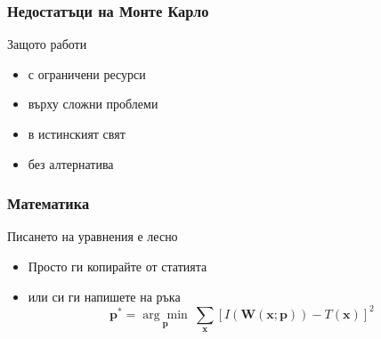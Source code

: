 \documentclass[serif,mathserif,14pt]{beamer}
\begin{document}
\begin{frame}
  \frametitle{Недостатъци на Монте Карло}
  \pause
  Защото работи\pause
  \begin{itemize}
  \item с ограничени ресурси\pause
  \item върху сложни проблеми\pause
  \item в истинският свят\pause
  \item без алтернатива
  \end{itemize}
\end{frame}

\begin{frame}
  \frametitle{Математика}
  Писането на уравнения е лесно
  \begin{itemize}
  \item Просто ги копирайте от статията\pause
  \item или си ги напишете на ръка
    \begin{equation*}
      \textbf{p}^* = \underset{\textbf{p}}{\arg\!\min}~\sum_{\textbf{x}}\left[ I(\textbf{W}(\textbf{x};\textbf{p})) - T(\textbf{x}) \right]^2
    \end{equation*}
  \end{itemize}
\end{frame}
\end{document}
